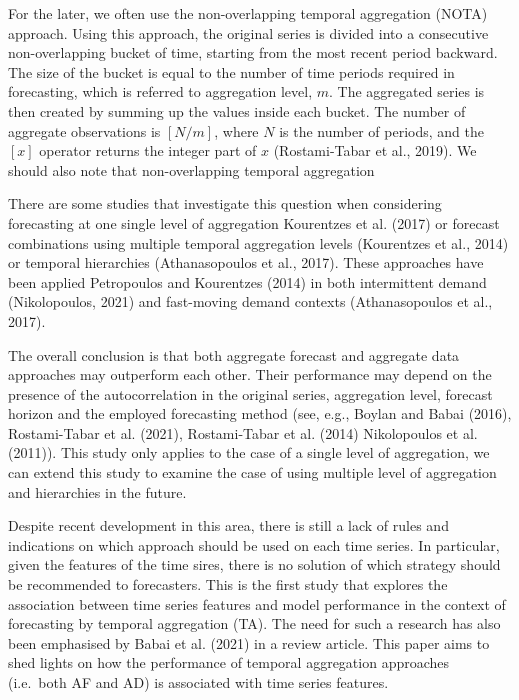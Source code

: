 \documentclass[]{elsarticle} %
\begin{document}
For the later, we often use the non-overlapping temporal aggregation
(NOTA) approach. Using this approach, the original series is divided
into a consecutive non-overlapping bucket of time, starting from the
most recent period backward. The size of the bucket is equal to the
number of time periods required in forecasting, which is referred to
aggregation level, \(m\). The aggregated series is then created by
summing up the values inside each bucket. The number of aggregate
observations is \([N/m]\), where \(N\) is the number of periods, and the
\([x]\) operator returns the integer part of \(x\) (Rostami-Tabar et
al., 2019). We should also note that non-overlapping temporal
aggregation

There are some studies that investigate this question when considering
forecasting at one single level of aggregation Kourentzes et al. (2017)
or forecast combinations using multiple temporal aggregation levels
(Kourentzes et al., 2014) or temporal hierarchies (Athanasopoulos et
al., 2017). These approaches have been applied Petropoulos and
Kourentzes (2014) in both intermittent demand (Nikolopoulos, 2021) and
fast-moving demand contexts (Athanasopoulos et al., 2017).

The overall conclusion is that both aggregate forecast and aggregate
data approaches may outperform each other. Their performance may depend
on the presence of the autocorrelation in the original series,
aggregation level, forecast horizon and the employed forecasting method
(see, e.g., Boylan and Babai (2016), Rostami-Tabar et al. (2021),
Rostami-Tabar et al. (2014) Nikolopoulos et al. (2011)). This study only
applies to the case of a single level of aggregation, we can extend this
study to examine the case of using multiple level of aggregation and
hierarchies in the future.

Despite recent development in this area, there is still a lack of rules
and indications on which approach should be used on each time series. In
particular, given the features of the time sires, there is no solution
of which strategy should be recommended to forecasters. This is the
first study that explores the association between time series features
and model performance in the context of forecasting by temporal
aggregation (TA). The need for such a research has also been emphasised
by Babai et al. (2021) in a review article. This paper aims to shed
lights on how the performance of temporal aggregation approaches
(i.e.~both AF and AD) is associated with time series features.
\end{document}
